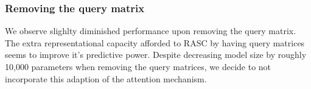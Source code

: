 
\subsubsection{Removing the query matrix}  %
We observe slighlty diminished performance upon removing the query matrix. The extra representational capacity afforded to RASC by having query matrices seems to improve it's predictive power. Despite decreasing model size by roughly 10,000 parameters when removing the query matrices, we decide to not incorporate this adaption of the attention mechanism. 


